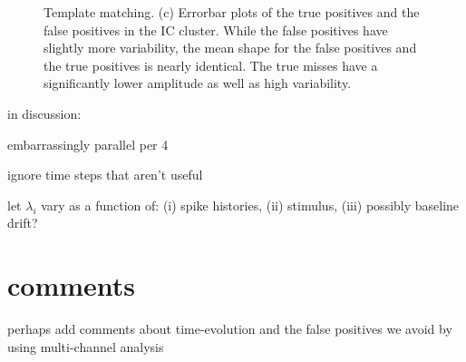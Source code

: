 \begin{center}
\begin{figure}[h!]
\begin{subfigure}[b]{.33\textwidth}
\caption{}
\label{truewaveforms}
\end{subfigure}
\caption{Template matching.
(c) Errorbar plots of the true positives and the false positives in the IC cluster.  While the false positives have slightly more variability, the mean shape for the false positives and the true positives is nearly identical.  The true misses have a significantly lower amplitude as well as high variability. 
} \label{fig:IC-PCA}
\end{figure}
\end{center}




in discussion:

embarrassingly parallel per 4

ignore time steps that aren't useful

let $\lambda_i$ vary as a function of: (i) spike histories, (ii) stimulus, (iii) possibly baseline drift?


\clearpage
\section{comments}

{\color{red} perhaps add comments about time-evolution and the false positives we avoid by using multi-channel analysis}




